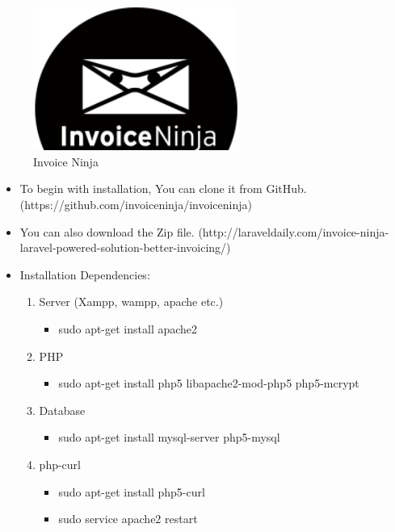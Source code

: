 \begin{figure}[!ht]
\centering
\includegraphics[width=0.6\textwidth]{images/nn.png}                   
\caption{Invoice Ninja}
\hspace{-1.5em}
\end{figure}
\begin{itemize}
\item To begin with installation, You can clone it from GitHub.(https://github.com/invoiceninja/invoiceninja)
\item You can also download the Zip file. (http://laraveldaily.com/invoice-ninja-laravel-powered-solution-better-invoicing/)
\item Installation Dependencies:
\begin{enumerate}
\item Server (Xampp, wampp, apache etc.)
\begin{itemize}
\item sudo apt-get install apache2
\end{itemize}
\item PHP 
\begin{itemize}
\item sudo apt-get install php5 libapache2-mod-php5 php5-mcrypt
\end{itemize}
\item Database
\begin{itemize}
\item sudo apt-get install mysql-server php5-mysql
\end{itemize}
\item php-curl
\begin{itemize}
\item sudo apt-get install php5-curl
\item sudo service apache2 restart
\end{itemize}
\end{enumerate}
\end{itemize}

